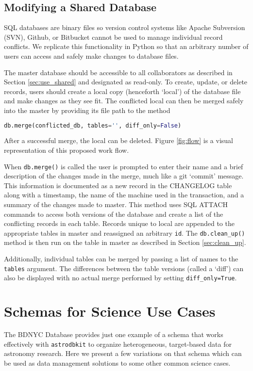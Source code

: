 \documentclass[iop,revtex4,natbib209]{emulateapj}
\begin{document}
\subsection{Modifying a Shared Database}{\label{sec:mod_shared}}
SQL databases are binary files so version control systems like Apache Subversion (SVN), Github, or Bitbucket cannot be used to manage individual record conflicts. We replicate this functionality in Python so that an arbitrary number of users can access and safely make changes to database files.

The master database should be accessible to all collaborators as described in Section \ref{sec:use_shared} and designated as read-only. To create, update, or delete records, users should create a local copy (henceforth `local') of the database file and make changes as they see fit. The conflicted local can then be merged safely into the master by providing its file path to the method

\begin{lstlisting}[language=Python]
db.merge(conflicted_db, tables='', diff_only=False)
\end{lstlisting}

After a successful merge, the local can be deleted. Figure \ref{fig:flow} is a visual representation of this proposed work flow.

When \texttt{db.merge()} is called the user is prompted to enter their name and a brief description of the changes made in the merge, much like a git `commit' message. This information is documented as a new record in the CHANGELOG table along with a timestamp, the name of the machine used in the transaction, and a summary of the changes made to master. This method uses SQL ATTACH commands to access both versions of the database and create a list of the conflicting records in each table. Records unique to local are appended to the appropriate tables in master and reassigned an arbitrary \texttt{id}. The \texttt{db.clean\_up()} method is then run on the table in master as described in Section \ref{sec:clean_up}.

Additionally, individual tables can be merged by passing a list of names to the \texttt{tables} argument. The differences between the table versions (called a `diff') can also be displayed with no actual merge performed by setting \texttt{diff\_only=True}.

\section{Schemas for Science Use Cases}{\label{sec:use_cases}}
The BDNYC Database provides just one example of a schema that works effectively with \texttt{astrodbkit} to organize heterogeneous, target-based data for astronomy research. Here we present a few variations on that schema which can be used as data management solutions to some other common science cases.
\end{document}
